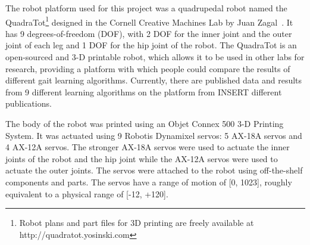The robot platform used for this project was a quadrupedal robot named the QuadraTot\footnote{Robot plans and part files for 3D printing are freely available at http://quadratot.yosinski.com} designed in the Cornell Creative Machines Lab by Juan Zagal~\cite{yos:clune}.
It has 9 degrees-of-freedom (DOF), with 2 DOF for the inner joint and the outer joint of each leg and 1 DOF for the hip joint of the robot. 
The QuadraTot is an open-sourced and 3-D printable robot, which allows it to be used in other labs for research, providing a platform with which people could compare the results of different gait learning algorithms. 
Currently, there are published data and results from 9 different learning algorithms on the platform from INSERT different publications. %


The body of the robot was printed using an Objet Connex 500 3-D Printing System. 
It was actuated using 9 Robotis Dynamixel servos: 5 AX-18A servos and 4 AX-12A servos. 
The stronger AX-18A servos were used to actuate the inner joints of the robot and the hip joint while the AX-12A servos were used to actuate the outer joints. 
The servos were attached to the robot using off-the-shelf components and parts.
The servos have a range of motion of [0, 1023], roughly equivalent to a physical range of [-12\degree, +120\degree]. 

